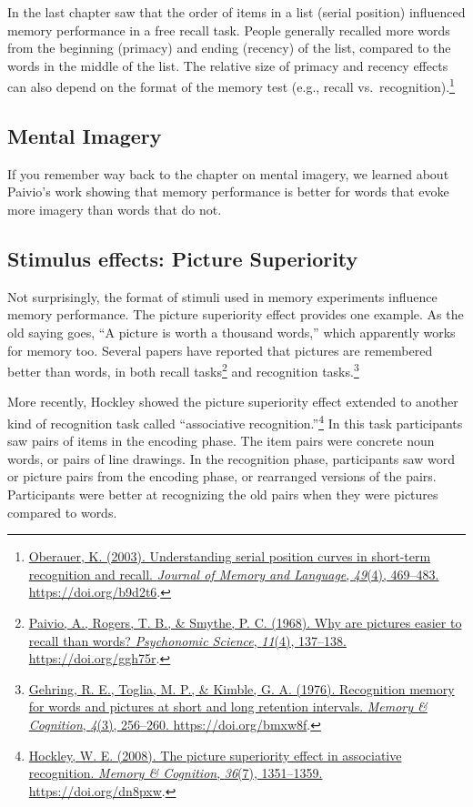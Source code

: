 \documentclass[
  oneside,
  12pt]{crumpbook}
\begin{document}
In the last chapter saw that the order of items in a list (serial position) influenced memory performance in a free recall task. People generally recalled more words from the beginning (primacy) and ending (recency) of the list, compared to the words in the middle of the list. The relative size of primacy and recency effects can also depend on the format of the memory test (e.g., recall vs.~recognition).\footnote{\protect\hyperlink{ref-oberauerUnderstandingSerialPosition2003}{Oberauer, K. (2003). Understanding serial position curves in short-term recognition and recall. \emph{Journal of Memory and Language}, \emph{49}(4), 469--483. \url{https://doi.org/b9d2t6}}.}

\hypertarget{mental-imagery-1}{%
\subsection{Mental Imagery}\label{mental-imagery-1}}

If you remember way back to the chapter on mental imagery, we learned about Paivio's work showing that memory performance is better for words that evoke more imagery than words that do not.

\hypertarget{stimulus-effects-picture-superiority}{%
\subsection{Stimulus effects: Picture Superiority}\label{stimulus-effects-picture-superiority}}

Not surprisingly, the format of stimuli used in memory experiments influence memory performance. The picture superiority effect provides one example. As the old saying goes, ``A picture is worth a thousand words,'' which apparently works for memory too. Several papers have reported that pictures are remembered better than words, in both recall tasks\footnote{\protect\hyperlink{ref-paivioWhyArePictures1968}{Paivio, A., Rogers, T. B., \& Smythe, P. C. (1968). Why are pictures easier to recall than words? \emph{Psychonomic Science}, \emph{11}(4), 137--138. \url{https://doi.org/ggh75r}}.} and recognition tasks.\footnote{\protect\hyperlink{ref-gehringRecognitionMemoryWords1976}{Gehring, R. E., Toglia, M. P., \& Kimble, G. A. (1976). Recognition memory for words and pictures at short and long retention intervals. \emph{Memory \& Cognition}, \emph{4}(3), 256--260. \url{https://doi.org/bmxw8f}}.}

More recently, Hockley showed the picture superiority effect extended to another kind of recognition task called ``associative recognition.''\footnote{\protect\hyperlink{ref-hockleyPictureSuperiorityEffect2008}{Hockley, W. E. (2008). The picture superiority effect in associative recognition. \emph{Memory \& Cognition}, \emph{36}(7), 1351--1359. \url{https://doi.org/dn8pxw}}.} In this task participants saw pairs of items in the encoding phase. The item pairs were concrete noun words, or pairs of line drawings. In the recognition phase, participants saw word or picture pairs from the encoding phase, or rearranged versions of the pairs. Participants were better at recognizing the old pairs when they were pictures compared to words.
\end{document}
